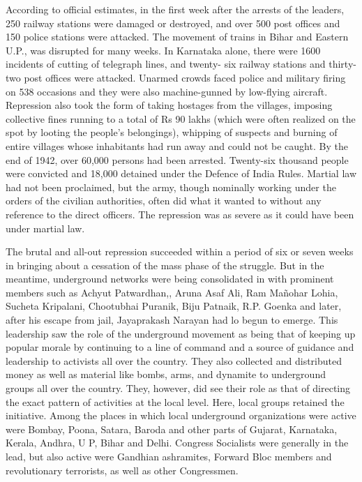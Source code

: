 According to official estimates, in the first week after the arrests of the leaders, 250 railway stations were damaged or destroyed, and over 500 post offices and 150 police stations were attacked. The movement of trains in Bihar and Eastern U.P., was disrupted for many weeks. In Karnataka alone, there were 1600 incidents of cutting of telegraph lines, and twenty- six railway stations and thirty-two post offices were attacked. Unarmed crowds faced police and military firing on 538 occasions and they were also machine-gunned by low-flying aircraft. Repression also took the form of taking hostages from the villages, imposing collective fines running to a total of Rs 90 lakhs (which were often realized on the spot by looting the people’s belongings), whipping of suspects and burning of entire villages whose inhabitants had run away and could not be caught. By the end of 1942, over 60,000 persons had been arrested. Twenty-six thousand people were convicted and 18,000 detained under the Defence of India Rules. Martial law had not been proclaimed, but the army, though nominally working under the orders of the civilian authorities, often did what it wanted to without any reference to the direct officers. The repression was as severe as it could have been under martial law.

The brutal and all-out repression succeeded within a period of six or seven weeks in bringing about a cessation of the mass phase of the struggle. But in the meantime, underground networks were being consolidated in with prominent members such as Achyut Patwardhan,, Aruna Asaf Ali, Ram Mañohar Lohia, Sucheta Kripalani, Chootubhai Puranik, Biju Patnaik, R.P. Goenka and later, after his escape from jail, Jayaprakash Narayan had lo begun to emerge. This leadership saw the role of the underground movement as being that of keeping up popular morale by continuing to a line of command and a source of guidance and leadership to activists all over the country. They also collected and distributed money as well as material like bombs, arms, and dynamite to underground groups all over the country. They, however, did see their role as that of directing the exact pattern of activities at the local level. Here, local groups retained the initiative. Among the places in which local underground organizations were active were Bombay, Poona, Satara, Baroda and other parts of Gujarat, Karnataka, Kerala, Andhra, U P, Bihar and Delhi. Congress Socialists were generally in the lead, but also active were Gandhian ashramites, Forward Bloc members and revolutionary terrorists, as well as other Congressmen.

